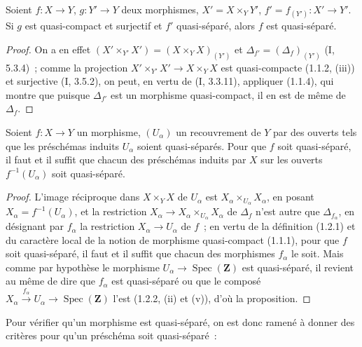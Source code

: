 \begin{proposition}[1.2.5]
\label{IV.1.2.5-fr}
Soient $f:X\to Y$, $g:Y'\to Y$ deux morphismes,
$X'=X\times_Y Y'$, $f'=f_{(Y')}:X'\to Y'$. Si $g$ est quasi-compact et
surjectif et $f'$ quasi-séparé, alors $f$ est quasi-séparé.
\end{proposition}

\begin{proof}
On a en effet $(X'\times_{Y'}X')=(X\times_YX)_{(Y')}$ et
$\Delta_{f'}=(\Delta_f)_{(Y')}$ (I, 5.3.4)~; comme la projection
$X'\times_{Y'}X'\to X\times_YX$ est quasi-compacte (1.1.2, (iii)) et
surjective (I, 3.5.2), on peut, en vertu de (I, 3.3.11), appliquer (1.1.4),
qui montre que puisque $\Delta_{f'}$ est un morphisme quasi-compact, il en est
de même de $\Delta_f$.
\end{proof}

\begin{proposition}[1.2.6]
\label{IV.1.2.6-fr}
Soient $f:X\to Y$ un morphisme, $(U_\alpha)$ un recouvrement de $Y$ par des
ouverts tels que les préschémas induits $U_\alpha$ soient quasi-séparés. Pour
que $f$ soit quasi-séparé, il faut et il suffit que chacun des préschémas
induits par $X$ sur les ouverts $f^{-1}(U_\alpha)$ soit quasi-séparé.
\end{proposition}

\begin{proof}
L'image réciproque dans $X\times_YX$ de $U_\alpha$ est
$X_\alpha\times_{U_\alpha}X_\alpha$, en posant
$X_\alpha=f^{-1}(U_\alpha)$, et la restriction
$X_\alpha\to X_\alpha\times_{U_\alpha}X_\alpha$ de $\Delta_f$ n'est autre
que $\Delta_{f_\alpha}$, en désignant par $f_\alpha$ la restriction
$X_\alpha\to U_\alpha$ de $f$~; en vertu de la définition (1.2.1) et du
caractère local de la notion de morphisme quasi-compact (1.1.1), pour que $f$
soit quasi-séparé, il faut et il suffit que chacun des morphismes $f_\alpha$
le soit. Mais comme par hypothèse le morphisme
$U_\alpha\to\operatorname{Spec}(\mathbf Z)$ est quasi-séparé, il revient au
même de dire que $f_\alpha$ est quasi-séparé ou que le composé
$X_\alpha\xrightarrow{f_\alpha}U_\alpha\to\operatorname{Spec}(\mathbf Z)$
l'est (1.2.2, (ii) et (v)), d'où la proposition.
\end{proof}


Pour vérifier qu'un morphisme est quasi-séparé, on est donc ramené à donner
des critères pour qu'un préschéma soit quasi-séparé~:

